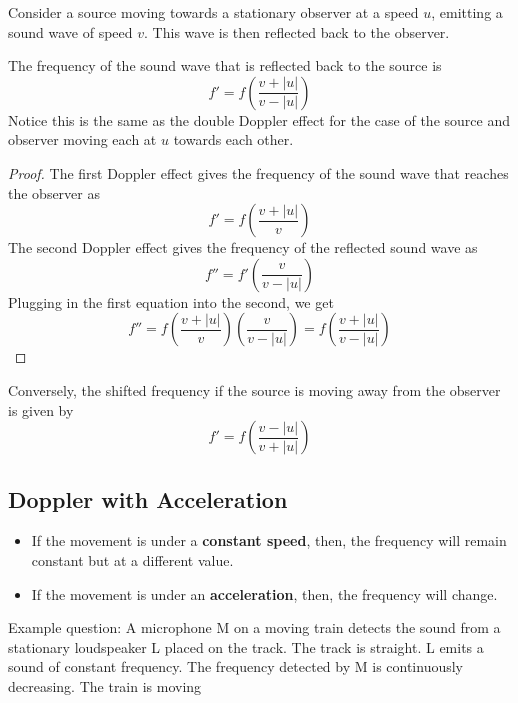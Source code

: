 \documentclass[a4paper,12pt]{article}
\newcommand{\paren}[1]{\left(#1\right)}
\begin{document}
Consider a source moving towards a stationary observer at a speed $u$, emitting a sound wave of speed $v$. This wave is then reflected back to the observer.

\begin{prop}
  The frequency of the sound wave that is reflected back to the source is
  \begin{equation}
    f' = f\paren{\frac{v + |u|}{v - |u|}}
  \end{equation}
  Notice this is the same as the double Doppler effect for the case of the source and observer moving each at $u$ towards each other.

  \begin{proof}

    \smallskip


    The first Doppler effect gives the frequency of the sound wave that reaches the observer as
    $$f' = f\paren{\frac{v + |u|}{v}}$$
    The second Doppler effect gives the frequency of the reflected sound wave as
    $$f'' = f'\paren{\frac{v}{v - |u|}}$$
    Plugging in the first equation into the second, we get
    $$f'' = f\paren{\frac{v + |u|}{v}}\paren{\frac{v}{v - |u|}} = f\paren{\frac{v + |u|}{v - |u|}}$$

  \end{proof}
  Conversely, the shifted frequency if the source is moving away from the observer is given by
  \begin{equation}
    f' = f\paren{\frac{v - |u|}{v + |u|}}
  \end{equation}

\end{prop}


\pagebreak

\subsection{Doppler with Acceleration}

\begin{itemize}
  \item If the movement is under a \textbf{constant speed}, then, the frequency will remain constant but at a different value.
  \item If the movement is under an \textbf{acceleration}, then, the frequency will change.
\end{itemize}

Example question: A microphone M on a moving train detects the sound from a stationary loudspeaker L placed on the track. The track is straight. L emits a sound of constant frequency. The frequency detected by M is continuously decreasing. The train is moving
\end{document}

